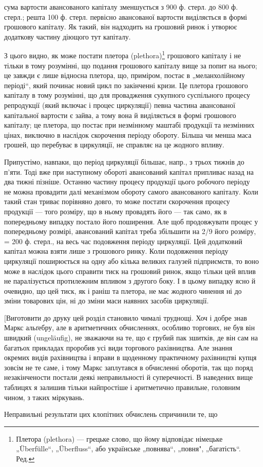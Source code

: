 \parcont{}  %
сума вартости авансованого капіталу зменшується з 900 ф. стерл. до
800 ф. стерл.; решта 100 ф. стерл. первісно авансованої вартости виділяється
в формі грошового капіталу. Як такий, він надходить на грошовий
ринок і утворює додаткову частину діющого тут капіталу.

З цього видно, як може постати плетора (plethora)\footnote*{
Плетора (plethora) — грецьке слово, що йому відповідає німецьке „Überfülle“,
„Überfluss“, або українське „повнява“, „повня", „багатість“. Ред.
} грошового капіталу
і не тільки в тому розумінні, що подання грошового капіталу вище
за попит на нього; це завжди є лише відносна плетора, що, приміром,
постає в „меланхолійному періоді“, який починає новий цикл по
закінченні кризи. Це плетора грошового капіталу в тому розумінні, що
для провадження сукупного суспільного процесу репродукції (який включає
і процес циркуляції) певна частина авансованої капітальної вартости
є зайва, а тому вона й виділяється в формі грошового капіталу; це плетора,
що постає при незмінному маштабі продукції та незмінних цінах,
виключно в наслідок скорочення періоду обороту. Більша чи менша маса
грошей, що перебуває в циркуляції, не справляє на це жодного впливу.

Припустімо, навпаки, що період циркуляції більшає, напр., з трьох
тижнів до п’яти. Тоді вже при наступному обороті авансований капітал
припливає назад на два тижні пізніше. Останню частину процесу продукції
цього робочого періоду не можна провадити далі механізмом обороту
самого авансованого капіталу. Коли такий стан триває порівняно довго,
то може постати скорочення процесу продукції — того розміру, що в
ньому провадять його — так само, як в попередньому випадку постало
його поширення. Але щоб продовжувати процес у попередньому розмірі,
авансований капітал треба збільшити на 2/9 його розміру, = 200 ф.
стерл., на весь час подовження періоду циркуляції. Цей додатковий капітал
можна взяти лише з грошового ринку. Коли подовження періоду
циркуляції поширюється на одну або кілька великих галузей підприємств,
то воно може в наслідок цього справити тиск на грошовий ринок, якщо
тільки цей вплив не паралізується протилежним впливом з другого боку.
І в цьому випадку ясно й очевидно, що цей тиск, як і раніш та плетора,
не має жодного чинення ні до зміни товарових цін, ні до зміни маси
наявних засобів циркуляції.

[Виготовити до друку цей розділ становило чималі труднощі. Хоч і
добре знав Маркс альґебру, але в аритметичних обчисленнях, особливо
торгових, не був він швидкий (ungeläufig), не зважаючи на те, що є грубий
пак зшитків, де він сам на багатьох прикладах проробив усі види торгового
рахівництва. Але знання окремих видів рахівництва і вправи в
щоденному практичному рахівництві купця зовсім не те саме, і тому
Маркс заплутався в обчисленні оборотів, так що поряд незакінчености
постали деякі неправильності й суперечності. В наведених вище таблицях
я залишив тільки найпростіше і аритметично правильне, головним чином,
з таких міркувань.

Неправильні результати цих клопітних обчислень спричинили те, що
\parbreak{}  %
